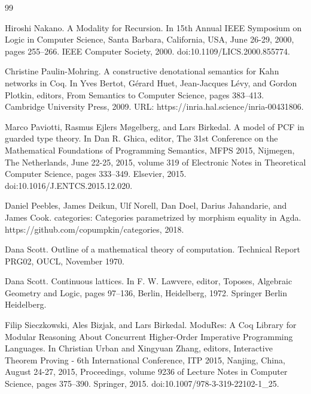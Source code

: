 \begin{thebibliography}{99}
\par\noindent    Hiroshi Nakano.  A Modality for Recursion.  In 15th Annual IEEE Symposium on Logic in Computer Science, Santa Barbara, California, USA, June 26-29, 2000, pages 255–266. IEEE Computer Society, 2000.  doi:10.1109/LICS.2000.855774.  

\par\noindent    Christine Paulin-Mohring.  A constructive denotational semantics for Kahn networks in Coq.  In Yves Bertot, Gérard Huet, Jean-Jacques Lévy, and Gordon Plotkin, editors, From Semantics to Computer Science, pages 383–413. Cambridge University Press, 2009.  URL: https://inria.hal.science/inria-00431806.  

\par\noindent    Marco Paviotti, Rasmus Ejlers Møgelberg, and Lars Birkedal.  A model of PCF in guarded type theory.  In Dan R. Ghica, editor, The 31st Conference on the Mathematical Foundations of Programming Semantics, MFPS 2015, Nijmegen, The Netherlands, June 22-25, 2015, volume 319 of Electronic Notes in Theoretical Computer Science, pages 333–349. Elsevier, 2015.  doi:10.1016/J.ENTCS.2015.12.020.  

\par\noindent    Daniel Peebles, James Deikun, Ulf Norell, Dan Doel, Darius Jahandarie, and James Cook.  categories: Categories parametrized by morphism equality in Agda.  https://github.com/copumpkin/categories, 2018.  

\par\noindent    Dana Scott.  Outline of a mathematical theory of computation.  Technical Report PRG02, OUCL, November 1970.  

\par\noindent    Dana Scott.  Continuous lattices.  In F. W. Lawvere, editor, Toposes, Algebraic Geometry and Logic, pages 97–136, Berlin, Heidelberg, 1972. Springer Berlin Heidelberg.  

\par\noindent    Filip Sieczkowski, Ales Bizjak, and Lars Birkedal.  ModuRes: A Coq Library for Modular Reasoning About Concurrent Higher-Order Imperative Programming Languages.  In Christian Urban and Xingyuan Zhang, editors, Interactive Theorem Proving - 6th International Conference, ITP 2015, Nanjing, China, August 24-27, 2015, Proceedings, volume 9236 of Lecture Notes in Computer Science, pages 375–390. Springer, 2015.  doi:10.1007/978-3-319-22102-1\_25.  


\end{thebibliography}
